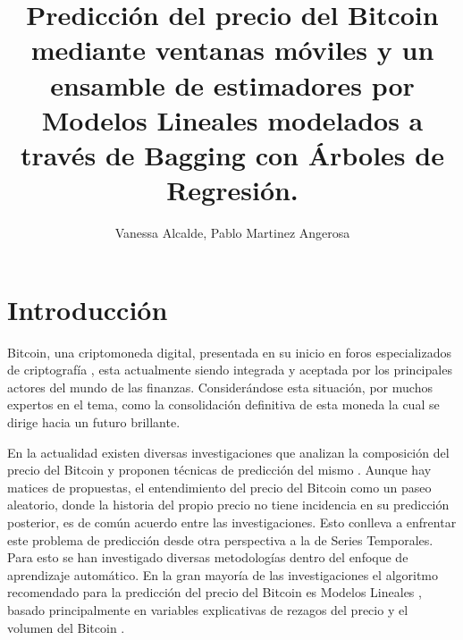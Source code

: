 \documentclass[a4paper,12pt,twocolumn]{article}
\date{ }
\title{\textbf{Predicción del precio del Bitcoin mediante ventanas móviles y un ensamble de estimadores por Modelos Lineales modelados a través de Bagging con Árboles de Regresión.}}
\author{Vanessa Alcalde, Pablo Martinez Angerosa}
\begin{document}
\setlength{\columnsep}{0.8cm}

\vspace{1.0cm}


\section{Introducción}
Bitcoin, una criptomoneda digital, presentada en su inicio en foros especializados de criptografía \cite{Satoshi}, esta actualmente siendo integrada y aceptada por los principales actores del mundo de las finanzas. Considerándose esta situación, por muchos expertos en el tema, como la consolidación definitiva de esta moneda la cual se dirige hacia un futuro brillante. 

En la actualidad existen diversas investigaciones que analizan la composición del precio del Bitcoin y proponen técnicas de predicción del mismo \cite{mainDriversBitcoin}. Aunque hay matices de propuestas, el entendimiento del precio del Bitcoin como un paseo aleatorio, donde la historia del propio precio no tiene incidencia en su predicción posterior, es de común acuerdo entre las investigaciones. Esto conlleva a enfrentar este problema de predicción desde otra perspectiva a la de Series Temporales. Para esto se han investigado diversas metodologías dentro del enfoque de aprendizaje automático. En la gran mayoría de las investigaciones el algoritmo recomendado para la predicción del precio del Bitcoin es Modelos Lineales  \cite{regression_for_bitcoin_price}, basado principalmente en variables explicativas de rezagos del precio y el volumen del Bitcoin  \cite{forecastinBitcoinClosing}.  
\end{document}
